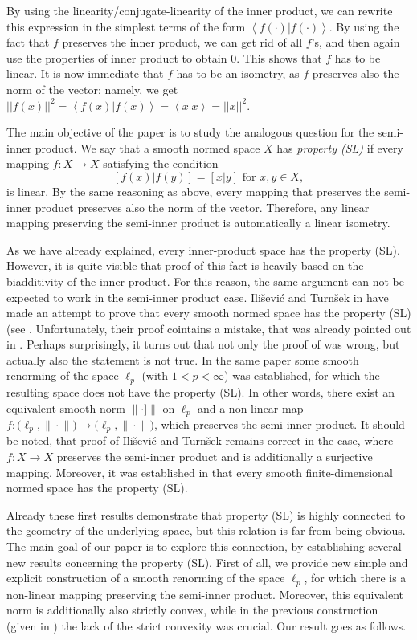 \documentclass[12pt, reqno]{amsart}
\theoremstyle{definition}
\theoremstyle{remark}
\numberwithin{equation}{section}
\newcommand{\ip}[2]{\left\langle#1|#2\right\rangle}
\newcommand{\sip}[2]{\left[#1|#2\right]}
\begin{document}
By using the linearity/conjugate-linearity of the inner product, we can rewrite this expression in the simplest terms of the form $\ip{f( \cdot)} {f( \cdot)}$. By using the fact that $f$ preserves the inner product, we can get rid of all $f$'s, and then again use the properties of inner product to obtain $0$. This shows that $f$ has to be linear. It is now immediate that $f$ has to be an isometry, as $f$ preserves also the norm of the vector; namely, we get $||f(x)||^2 = \ip{f(x)}{f(x)} = \ip{x}{x} = ||x||^2$.

The main objective of the paper is to study the analogous question for the semi-inner product. We say that a smooth normed space $X$ has \textit{property (SL)} if every mapping ${f\colon X\to X}$ satisfying the condition 
$$\sip{f(x)}{f(y)}=\sip{x}{y} \text { for } x, y \in X,$$ 
is linear. By the same reasoning as above, every mapping that preserves the semi-inner product preserves also the norm of the vector. Therefore, any linear mapping preserving the semi-inner product is automatically a linear isometry.

As we have already explained, every inner-product space has the property (SL). However, it is quite visible that proof of this fact is heavily based on the biadditivity of the inner-product. For this reason, the same argument can not be expected to work in the semi-inner product case. Ili\v{s}evi\'{c} and Turn\v{s}ek in \cite{ilisevic} have made an attempt to prove that every smooth normed space has the property (SL) (see \cite[Proposition 2.4]{ilisevic}. Unfortunately, their proof cointains a mistake, that was already pointed out in \cite{wojcik}. Perhaps surprisingly, it turns out that not only the proof of \cite[Proposition 2.4]{ilisevic} was wrong, but actually also the statement is not true. In the same paper \cite{wojcik} some smooth renorming of the space $\ell_p$ (with $1 < p < \infty$) was established, for which the resulting space does not have the property (SL). In other words, there exist an equivalent smooth norm $\|\!\cdot]\!\|$ on $\ell_p$ and a non-linear map $f\colon \big(\ell_p,\|\!\cdot \!\|\big) \to \big(\ell_p,\|\!\cdot \!\|\big)$, which preserves the semi-inner product. It should be noted, that proof of Ili\v{s}evi\'{c} and Turn\v{s}ek remains correct in the case, where $f\colon X \to X$ preserves the semi-inner product and is additionally a surjective mapping. Moreover, it was established in \cite{wojcik} that every smooth finite-dimensional normed space has the property (SL).

Already these first results demonstrate that property (SL) is highly connected to the geometry of the underlying space, but this relation is far from being obvious. The main goal of our paper is to explore this connection, by establishing several new results concerning the property (SL). First of all, we provide new simple and explicit construction of a smooth renorming of the space $\ell_p$, for which there is a non-linear mapping preserving the semi-inner product. Moreover, this equivalent norm is additionally also strictly convex, while in the previous construction (given in \cite{wojcik}) the lack of the strict convexity was crucial. Our result goes as follows.
\end{document}

